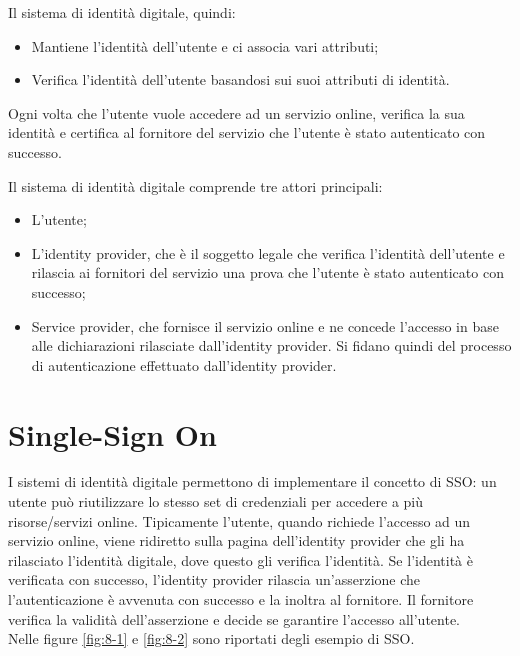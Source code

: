 \noindent Il sistema di identità digitale, quindi:
\begin{itemize}
    \item Mantiene l'identità dell'utente e ci associa vari attributi;
    \item Verifica l'identità dell'utente basandosi sui suoi attributi di identità.
\end{itemize}

Ogni volta che l'utente vuole accedere ad un servizio online, verifica la sua identità e certifica al fornitore del servizio che l'utente è stato autenticato con successo. 

\noindent Il sistema di identità digitale comprende tre attori principali:
\begin{itemize}
    \item L'utente;
    \item L'identity provider, che è il soggetto legale che verifica l'identità dell'utente e rilascia ai fornitori del servizio una prova che l'utente è stato autenticato con successo;
    \item Service provider, che fornisce il servizio online e ne concede l'accesso in base alle dichiarazioni rilasciate dall'identity provider. Si fidano quindi del processo di autenticazione effettuato dall'identity provider.
\end{itemize}

\section{Single-Sign On}
I sistemi di identità digitale permettono di implementare il concetto di SSO: un utente può riutilizzare lo stesso set di credenziali per accedere a più risorse/servizi online. Tipicamente l'utente, quando richiede l'accesso ad un servizio online, viene ridiretto sulla pagina dell'identity provider che gli ha rilasciato l'identità digitale, dove questo gli verifica l'identità. Se l'identità è verificata con successo, l'identity provider rilascia un'asserzione che l'autenticazione è avvenuta con successo e la inoltra al fornitore. Il fornitore verifica la validità dell'asserzione e decide se garantire l'accesso all'utente. 
\\

\noindent Nelle figure \ref{fig:8-1} e \ref{fig:8-2} sono riportati degli esempio di SSO.

